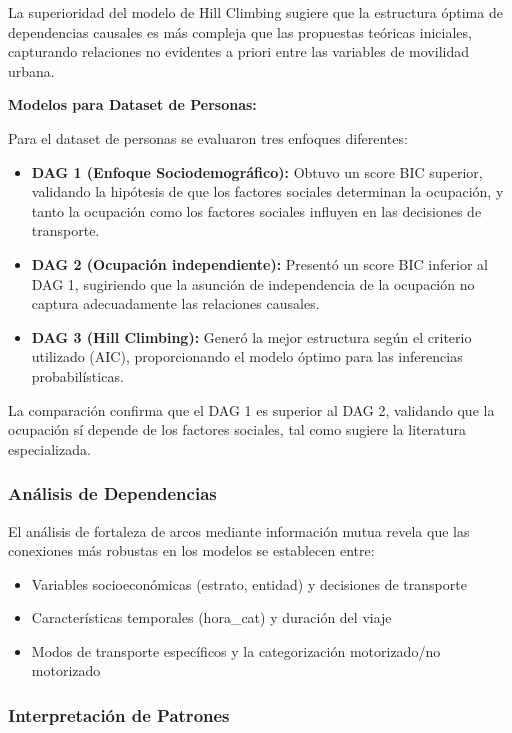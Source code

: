 \documentclass[12pt,a4paper]{article}
\begin{document}
La superioridad del modelo de Hill Climbing sugiere que la estructura óptima de dependencias causales es más compleja que las propuestas teóricas iniciales, capturando relaciones no evidentes a priori entre las variables de movilidad urbana.

\textbf{Modelos para Dataset de Personas:}

Para el dataset de personas se evaluaron tres enfoques diferentes:
\begin{itemize}
    \item \textbf{DAG 1 (Enfoque Sociodemográfico):} Obtuvo un score BIC superior, validando la hipótesis de que los factores sociales determinan la ocupación, y tanto la ocupación como los factores sociales influyen en las decisiones de transporte.
    \item \textbf{DAG 2 (Ocupación independiente):} Presentó un score BIC inferior al DAG 1, sugiriendo que la asunción de independencia de la ocupación no captura adecuadamente las relaciones causales.
    \item \textbf{DAG 3 (Hill Climbing):} Generó la mejor estructura según el criterio utilizado (AIC), proporcionando el modelo óptimo para las inferencias probabilísticas.
\end{itemize}

La comparación confirma que el DAG 1 es superior al DAG 2, validando que la ocupación sí depende de los factores sociales, tal como sugiere la literatura especializada.

\subsubsection{Análisis de Dependencias}

El análisis de fortaleza de arcos mediante información mutua revela que las conexiones más robustas en los modelos se establecen entre:
\begin{itemize}
    \item Variables socioeconómicas (estrato, entidad) y decisiones de transporte
    \item Características temporales (hora\_cat) y duración del viaje
    \item Modos de transporte específicos y la categorización motorizado/no motorizado
\end{itemize}

\subsubsection{Interpretación de Patrones}
\end{document}
